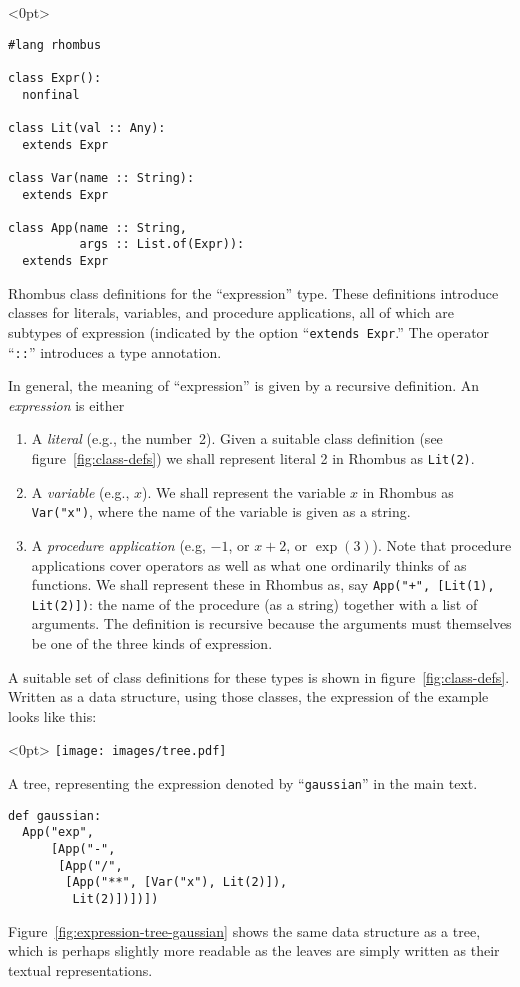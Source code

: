 \documentclass[11pt, a4paper]{article}
\newcommand{\cd}[1]{\texttt{#1}}
\begin{document}
\begin{marginfigure}<0pt>
  \footnotesize
\begin{verbatim}
#lang rhombus

class Expr():
  nonfinal

class Lit(val :: Any):
  extends Expr

class Var(name :: String):
  extends Expr

class App(name :: String,
          args :: List.of(Expr)):
  extends Expr
\end{verbatim}
  \caption{Rhombus class definitions for the ``expression''
    type. These definitions introduce classes for literals, variables,
    and procedure applications, all of which are subtypes of
    expression (indicated by the option ``\cd{extends Expr}.'' The
    operator ``\cd{::}'' introduces a type annotation.\label{fig:class-defs}}
\end{marginfigure}
In general, the meaning of ``expression'' is given by a recursive
definition. An \emph{expression} is either
\begin{enumerate}
\item A \emph{literal} (e.g., the number~2). Given a suitable class
  definition (see figure~\ref{fig:class-defs}) we shall represent
  literal 2 in Rhombus as \cd{Lit(2)}.
\item A \emph{variable} (e.g., $x$). We shall represent the variable
  $x$ in Rhombus as \cd{Var("x")}, where the name of the variable is
  given as a string.
\item A \emph{procedure application} (e.g, $-1$, or $x + 2$, or
  $\exp(3)$). Note that procedure applications cover operators as well
  as what one ordinarily thinks of as functions. We shall represent
  these in Rhombus as, say \cd{App("+", [Lit(1), Lit(2)])}: the name
  of the procedure (as a string) together with a list of
  arguments. The definition is recursive because the arguments must
  themselves be one of the three kinds of expression.
\end{enumerate}

A suitable set of class definitions for these types is shown in
figure~\ref{fig:class-defs}. Written as a data structure, using those
classes, the expression of the example looks like this:
\begin{marginfigure}<0pt>
  \centering
  \texttt{[image: images/tree.pdf]}
  \caption{A tree, representing the expression denoted by
    ``\cd{gaussian}'' in the main text.\label{fig:expression-tree-gaussian}}
\end{marginfigure}
\begin{verbatim}
def gaussian:
  App("exp",
      [App("-",
       [App("/",
        [App("**", [Var("x"), Lit(2)]),
         Lit(2)])])])
\end{verbatim}
Figure~\ref{fig:expression-tree-gaussian} shows the same data
structure as a tree, which is perhaps slightly more
readable as the leaves are simply written as their textual
representations.
\end{document}
